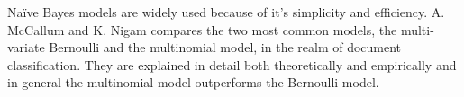 	Naïve Bayes models are widely used because of it's simplicity and efficiency. A. McCallum and K. Nigam compares the two most common models, the multi-variate Bernoulli and the multinomial model, in the realm of document classification. They are explained in detail both theoretically and empirically and in general the multinomial model outperforms the Bernoulli model. \cite{McCallum98acomparison}